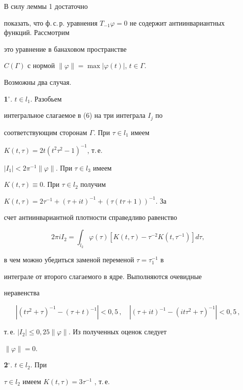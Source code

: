 \begin{pf}


В силу леммы 1 достаточно


показать, что ф.\,с.\,р. уравнения $T_{-1}


\varphi=0$ не содержит антиинвариантных функций. Рассмотрим


это уравнение в банаховом пространстве


$C(\Gamma)$ с нормой $\|\varphi\|=\max|\varphi(t)|$, $t\in\Gamma$.


Возможны два случая.





{\bf 1${}^\circ$}. $t\in l_{1}$. Разобьем


интегральное слагаемое в (6) на три интеграла $I_{j}$ по


соответствующим сторонам $\Gamma$. При $\tau\in l_{1}$ имеем


$K(t,\tau)=2t(t^{2}\tau^{2}-1)^{-1}$, т.\,е.


$|I_{1}|<2\pi^{-1}\|\varphi\|$. При $\tau\in l_{3}$ имеем


$K(t,\tau)\equiv 0$. При $\tau\in l_{2}$ получим


$K(t,\tau)=2\tau^{-1}+(\tau+it)^{-1}+(\tau(t\tau +1))^{-1}$. За


счет антиинвариантной плотности справедливо равенство


$$


2\pi iI_{2}=\int_{l_{2}}\varphi(\tau)[K(t,\tau)-


\tau^{-2}K(t,\tau^{-1})]d\tau,


$$


в чем можно убедиться заменой переменой $\tau=\tau_{1}^{-1}$ в


интеграле от второго слагаемого в ядре. Выполняются очевидные


неравенства


$$ 


|(t\tau^{2}+\tau)^{-1}-(\tau+t)^{-1}|<0{,}5\,,\quad


|(\tau+it)^{-1}-(it\tau^{2}+\tau)^{-1}|<0{,}5\,,


$$


т.\,е. $|I_{2}|\le 0{,}25\|\varphi\|$.  Из полученных оценок следует


$\|\varphi\|=0$.





{\bf 2${}^\circ$}. $t\in l_{2}$. При


$\tau\in l_{2}$ имеем $K(t,\tau)=3\tau^{-1}$ , т.\,е.



\end{pf}

